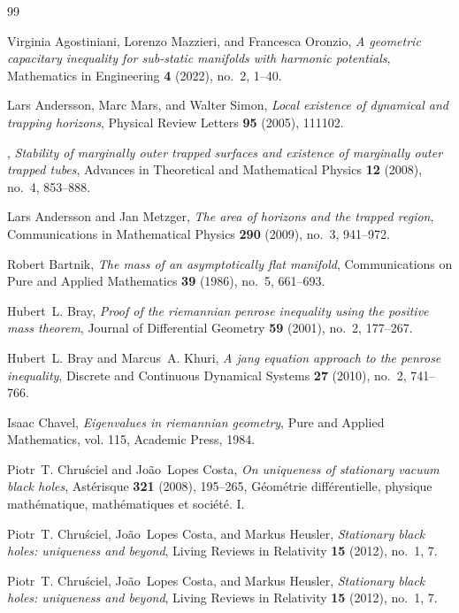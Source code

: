 \begin{thebibliography}{99}

Virginia Agostiniani, Lorenzo Mazzieri, and Francesca Oronzio, \emph{A
  geometric capacitary inequality for sub-static manifolds with harmonic
  potentials}, Mathematics in Engineering \textbf{4} (2022), no.~2, 1--40.

Lars Andersson, Marc Mars, and Walter Simon, \emph{Local existence of dynamical
  and trapping horizons}, Physical Review Letters \textbf{95} (2005), 111102.

\bysame, \emph{Stability of marginally outer trapped surfaces and existence of
  marginally outer trapped tubes}, Advances in Theoretical and Mathematical
  Physics \textbf{12} (2008), no.~4, 853--888.

Lars Andersson and Jan Metzger, \emph{The area of horizons and the trapped
  region}, Communications in Mathematical Physics \textbf{290} (2009), no.~3,
  941--972.

Robert Bartnik, \emph{The mass of an asymptotically flat manifold},
  Communications on Pure and Applied Mathematics \textbf{39} (1986), no.~5,
  661--693.

Hubert~L. Bray, \emph{Proof of the riemannian penrose inequality using the
  positive mass theorem}, Journal of Differential Geometry \textbf{59} (2001),
  no.~2, 177--267.

Hubert~L. Bray and Marcus~A. Khuri, \emph{A jang equation approach to the
  penrose inequality}, Discrete and Continuous Dynamical Systems \textbf{27}
  (2010), no.~2, 741--766.

Isaac Chavel, \emph{Eigenvalues in riemannian geometry}, Pure and Applied
  Mathematics, vol. 115, Academic Press, 1984.

Piotr~T. Chru\'sciel and Jo\~ao~Lopes Costa, \emph{On uniqueness of stationary
  vacuum black holes}, Ast\'erisque \textbf{321} (2008), 195--265,
  G\'eom\'etrie diff\'erentielle, physique math\'ematique, math\'ematiques et
  soci\'et\'e. I.

Piotr~T. Chru\'sciel, Jo\~ao~Lopes Costa, and Markus Heusler, \emph{Stationary
  black holes: uniqueness and beyond}, Living Reviews in Relativity \textbf{15}
  (2012), no.~1, 7.

Piotr~T. Chru\'sciel, Jo\~ao~Lopes Costa, and Markus Heusler, \emph{Stationary
  black holes: uniqueness and beyond}, Living Reviews in Relativity \textbf{15}
  (2012), no.~1, 7.


\end{thebibliography}
